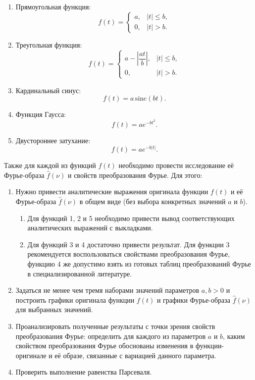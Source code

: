 \documentclass[a4paper, 12pt]{article}
\begin{document}
\begin{enumerate}
    \item Прямоугольная функция:
    \[
    f(t)=
    \begin{cases}
    a, & |t|\leq b,\\
    0, & |t|>b.
    \end{cases}
    \]

    \item Треугольная функция:
    \[
    f(t)=
    \begin{cases}
    a - \left| \dfrac{a t}{b} \right|, & |t|\leq b,\\
    0, & |t|>b.
    \end{cases}
    \]

    \item Кардинальный синус:
    \[
    f(t)=a\,\mathrm{sinc}(bt).
    \]

    \item Функция Гаусса:
    \[
    f(t)=a e^{-b t^2}.
    \]

    \item Двустороннее затухание:
    \[
    f(t)=a e^{-b|t|}.
    \]
\end{enumerate}

Также для каждой из функций $f(t)$ необходимо провести исследование её Фурье-образа $\hat{f}(\nu)$ и свойств преобразования Фурье. Для этого:

\begin{enumerate}
    \item Нужно привести аналитические выражения оригинала функции $f(t)$ и её Фурье-образа $\hat{f}(\nu)$ в общем виде (без выбора конкретных значений $a$ и $b$).
    
    \begin{enumerate}
        \item Для функций 1, 2 и 5 необходимо привести вывод соответствующих аналитических выражений с выкладками.
        \item Для функций 3 и 4 достаточно привести результат. Для функции 3 рекомендуется воспользоваться свойствами преобразования Фурье, функцию 4 же допустимо взять из готовых таблиц преобразований Фурье в специализированной литературе.
    \end{enumerate}

    \item Задаться не менее чем тремя наборами значений параметров $a, b > 0$ и построить графики оригинала функции $f(t)$ и графики Фурье-образа $\hat{f}(\nu)$ для выбранных значений.
    
    \item Проанализировать полученные результаты с точки зрения свойств преобразования Фурье: определить для каждого из параметров $a$ и $b$, каким свойством преобразования Фурье обоснованы изменения в функции-оригинале и её образе, связанные с вариацией данного параметра.

    \item Проверить выполнение равенства Парсеваля.
\end{enumerate}
\end{document}
